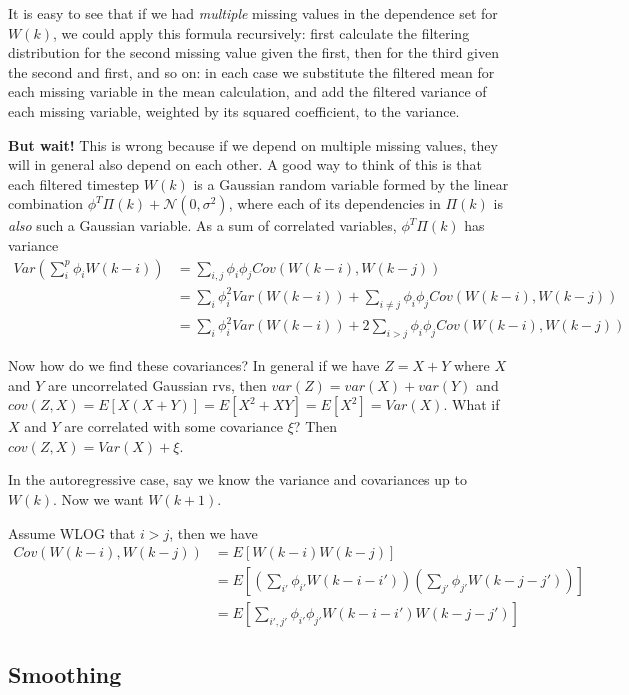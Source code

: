 \documentclass{article}
\newcommand{\N}{\mathcal{N}}
\begin{document}
It is easy to see that if we had {\em multiple} missing values in the dependence set for $W(k)$, we could apply this formula recursively: first calculate the filtering distribution for the second missing value given the first, then for the third given the second and first, and so on: in each case we substitute the filtered mean for each missing variable in the mean calculation, and add the filtered variance of each missing variable, weighted by its squared coefficient, to the variance.

{\bf But wait!} This is wrong because if we depend on multiple missing values, they will in general also depend on each other. A good way to think of this is that each filtered timestep $W(k)$ is a Gaussian random variable formed by the linear combination $\phi^T \Pi(k) + \N(0, \sigma^2)$, where each of its dependencies in $\Pi(k)$ is {\em also} such a Gaussian variable. As a sum of correlated variables, $\phi^T \Pi(k)$ has variance
\begin{align*}
Var\left(\sum_i^p \phi_i W(k-i) \right) &= \sum_{i,j} \phi_i \phi_j Cov(W(k-i), W(k-j))  \\
&= \sum_i \phi_i^2 Var(W(k-i)) + \sum_{i \ne j} \phi_i \phi_j Cov(W(k-i), W(k-j)) \\
&= \sum_i \phi_i^2 Var(W(k-i)) + 2\sum_{i > j} \phi_i \phi_j Cov(W(k-i), W(k-j))
\end{align*}

Now how do we find these covariances? In general if we have $Z = X+Y$ where $X$ and $Y$ are uncorrelated Gaussian rvs, then $var(Z) = var(X) + var(Y)$ and $cov(Z, X) = E[X(X+Y)] = E[X^2 + XY] = E[X^2] = Var(X)$.
What if $X$ and $Y$ are correlated with some covariance $\xi$? Then $cov(Z, X) = Var(X) + \xi$.

In the autoregressive case, say we know the variance and covariances up to $W(k)$. Now we want $W(k+1)$.


Assume WLOG that $i > j$, then we have
\begin{align*}
Cov(W(k-i), W(k-j)) &= E\left[ W(k-i) W(k-j) \right]\\
&= E\left[\left(\sum_{i'}\phi_{i'} W(k-i-i')\right) \left(\sum_{j'} \phi_{j'}W(k-j-j')\right)  \right]\\
&= E\left[\sum_{i',j'}\phi_{i'} \phi_{j'} W(k-i-i') W(k-j-j')  \right]
\end{align*}


\subsection{Smoothing}
\end{document}
